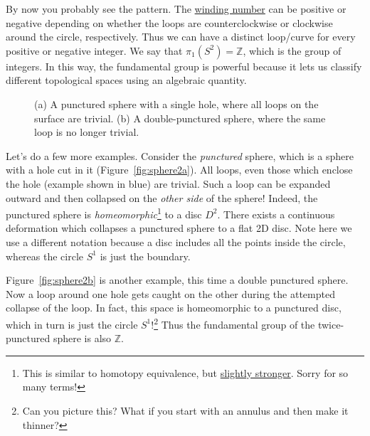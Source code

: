 \documentclass[12pt, english]{book}
\begin{document}
By now you probably see the pattern. 
The \href{https://en.wikipedia.org/wiki/Winding_number}{winding number} can be positive or negative depending on whether the loops are counterclockwise or clockwise around the circle, respectively.
Thus we can have a distinct loop/curve for every positive or negative integer.
We say that $\pi_1(S^2) = \mathbb{Z}$, which is the group of integers.
In this way, the fundamental group is powerful because it lets us classify different topological spaces using an algebraic quantity.

\begin{figure}[!ht]
	\centering 
	 \hspace{6ex}
	\caption{(a) A punctured sphere with a single hole, where all loops on the surface are trivial.
	(b) A double-punctured sphere, where the same loop is no longer trivial.}
	\label{fig:sphere2}
\end{figure}

Let's do a few more examples. 
Consider the \emph{punctured} sphere, which is a sphere with a hole cut in it (Figure~\ref{fig:sphere2a}).
All loops, even those which enclose the hole (example shown in blue) are trivial.
Such a loop can be expanded outward and then collapsed on the \emph{other side} of the sphere!
Indeed, the punctured sphere is \emph{homeomorphic}\footnote{This is similar to homotopy equivalence, but \href{https://en.wikipedia.org/wiki/Homotopy\#Homotopy_equivalence_vs._homeomorphism}{slightly stronger}. Sorry for so many terms!} to a disc $D^2$.
There exists a continuous deformation which collapses a punctured sphere to a flat 2D disc.
Note here we use a different notation because a disc includes all the points inside the circle, whereas the circle $S^1$ is just the boundary.

Figure~\ref{fig:sphere2b} is another example, this time a double punctured sphere.
Now a loop around one hole gets caught on the other during the attempted collapse of the loop.
In fact, this space is homeomorphic to a punctured disc, which in turn is just the circle $S^1$!\footnote{Can you picture this? What if you start with an annulus and then make it thinner?} 
Thus the fundamental group of the twice-punctured sphere is also $\mathbb{Z}$.


\end{document}
